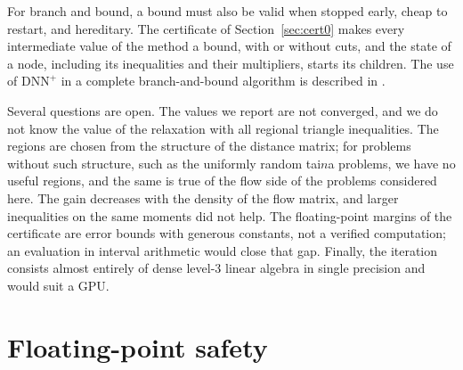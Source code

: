\documentclass[11pt]{article}
\theoremstyle{remark}
\newcommand{\DNNp}{\mathrm{DNN}^{+}}
\begin{document}
For branch and bound, a bound must also be valid when stopped early, cheap to
restart, and hereditary. The certificate of Section~\ref{sec:cert0} makes every
intermediate value of the method a bound, with or without cuts, and the state of
a node, including its inequalities and their multipliers, starts its children.
The use of $\DNNp$ in a complete branch-and-bound algorithm is described in
\cite{companion}.

Several questions are open. The values we report are not converged, and we do
not know the value of the relaxation with all regional triangle inequalities.
The regions are chosen from the structure of the distance matrix; for problems
without such structure, such as the uniformly random tai$n$a problems, we have
no useful regions, and the same is true of the flow side of the problems
considered here. The gain decreases with the density of the flow matrix, and
larger inequalities on the same moments did not help. The floating-point
margins of the certificate are error bounds with generous constants, not a
verified computation; an evaluation in interval arithmetic would close that
gap. Finally, the iteration consists almost entirely of dense level-3 linear
algebra in single precision and would suit a GPU.

\appendix
\section{Floating-point safety}\label{sec:fp}
\end{document}

